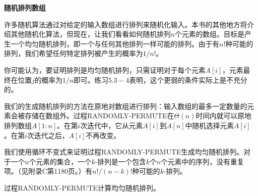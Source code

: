 \documentclass[lang=cn,newtx,10pt,scheme=chinese]{elegantbook}
\begin{document}
\textbf{随机排列数组}

许多随机算法通过对给定的输入数组进行排列来随机化输入。本书的其他地方将介绍其他随机化算法，但现在，让我们看看如何随机排列$n$个元素的数组。目标是产生一个均匀随机排列，即一个与任何其他排列一样可能的排列。由于有$n$!种可能的排列，我们希望任何特定排列被产生的概率为$1 / n !$。

你可能认为，要证明排列是均匀随机排列，只需证明对于每个元素$A[i]$，元素最终在位置$j$的概率为$1 / n$即可。练习$5.3-4$表明，这个更弱的条件实际上是不充分的。

我们的生成随机排列的方法在原地对数组进行排列：输入数组的最多一定数量的元素会被存储在数组外。过程RANDOMLY-PERMUTE在$\Theta(n)$时间内就可以原地排列数组$A[1:n]$。在第$i$次迭代中，它从元素$A[i]$到$A[n]$中随机选择元素$A[i]$。在第$i$次迭代之后，$A[i]$不再改变。

我们使用循环不变式来证明过程RANDOMLY-PERMUTE生成均匀随机排列。对于一个$n$个元素的集合，一个$k$-排列是一个包含$k$个$n$个元素中的序列，没有重复项。（见附录C第1180页。）有$n!/(n-k)$!种可能的$k$-排列。

\begin{lemma}{}{}
过程RANDOMLY-PERMUTE计算均匀随机排列。
\end{lemma}
\end{document}
